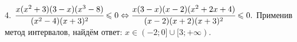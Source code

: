 4. $\cfrac{x(x^2+3)(3-x)(x^3-8)}{(x^2-4)(x+3)^2}\leqslant 0 \Leftrightarrow \cfrac{x(3-x)(x-2)(x^2+2x+4)}{(x-2)(x+2)(x+3)^2}\leqslant 0.$ Применив метод интервалов, найдём ответ: $x\in(-2;0]\cup[3;+\infty).$
\begin{figure}[ht!]
\end{figure}\\
